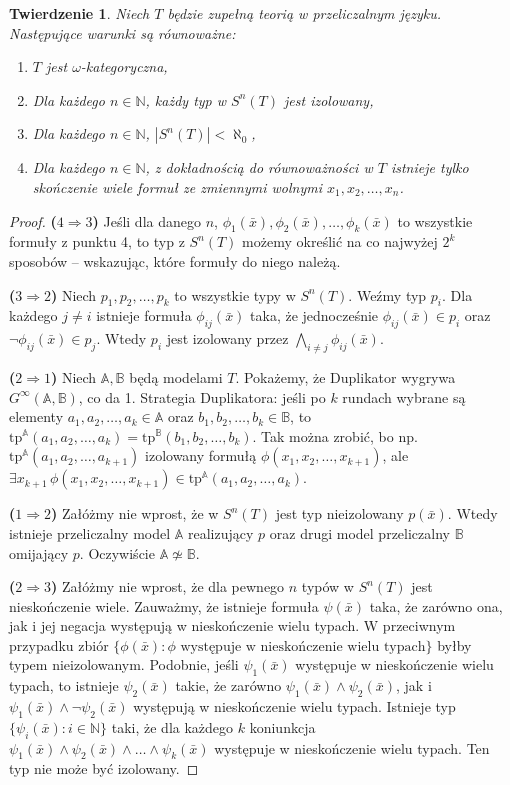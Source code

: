 \documentclass{article}
\newcommand{\N}{\mathbb{N}}
\newcommand{\A}{\mathbb{A}}
\newcommand{\B}{\mathbb{B}}
\theoremstyle{plain}
\newtheorem{tw}[thm]{Twierdzenie}
\theoremstyle{definition}
\theoremstyle{remark}
\begin{document}
\begin{tw}
	 Niech $T$ będzie zupełną teorią w przeliczalnym języku.
	 Następujące warunki są równoważne:
	 \begin{enumerate}
		 \item $T$ jest $\omega$-kategoryczna,
		 \item Dla każdego $n \in \N$, każdy typ w $S^n(T)$ jest izolowany,
		 \item Dla każdego $n \in \N$, $|S^n(T)| < \aleph_0$,
		 \item Dla każdego $n \in \N$, z dokładnością do równoważności w $T$ istnieje tylko skończenie wiele formuł ze zmiennymi wolnymi $x_1, x_2, \ldots, x_n$.
	 \end{enumerate}
\end{tw}
\begin{proof}
	\textbf{($4 \Rightarrow 3$)} Jeśli dla danego $n$, $\phi_1(\bar{x}), \phi_2(\bar{x}), \ldots, \phi_k(\bar{x})$  to wszystkie formuły z punktu 4, to typ z $S^n(T)$ możemy określić na co najwyżej $2^k$ sposobów -- wskazując, które formuły do niego należą.

	\textbf{($3 \Rightarrow 2$)} Niech $p_1, p_2, \ldots, p_k$ to wszystkie typy w $S^n(T)$.
	Weźmy typ $p_i$.
	Dla każdego $j \neq i$ istnieje formuła $\phi_{ij}(\bar{x})$ taka, że jednocześnie $\phi_{ij}(\bar{x}) \in p_i$ oraz $\neg \phi_{ij}(\bar{x}) \in p_j$.
	Wtedy $p_i$ jest izolowany przez $\bigwedge_{i \neq j} \phi_{ij}(\bar{x})$.

	\textbf{($2 \Rightarrow 1$)} Niech $\A, \B$ będą modelami $T$.
	Pokażemy, że Duplikator wygrywa $G^{\infty}(\A, \B)$, co da 1.
	Strategia Duplikatora:
	jeśli po $k$ rundach wybrane są elementy $a_1, a_2, \ldots, a_k \in \A$ oraz $b_1, b_2, \ldots, b_k \in \B$, to $\text{tp}^{\A}(a_1, a_2, \ldots, a_k) = \text{tp}^{\B}(b_1, b_2, \ldots, b_k)$.
	Tak można zrobić, bo np. $\text{tp}^{\A}(a_1, a_2, \ldots, a_{k+1})$ izolowany formułą
	$\phi(x_1, x_2, \ldots, x_{k+1})$, ale $\exists x_{k+1} \, \phi(x_1, x_2, \ldots, x_{k+1}) \in \text{tp}^{\A}(a_1, a_2, \ldots, a_k)$.

	\textbf{($1 \Rightarrow 2$)} Załóżmy nie wprost, że w $S^n(T)$ jest typ nieizolowany $p(\bar{x})$.
	Wtedy istnieje przeliczalny model $\A$ realizujący $p$ oraz drugi model przeliczalny $\B$ omijający $p$.
	Oczywiście $\A \not \simeq \B$.

	\textbf{($2 \Rightarrow 3$)}
	Załóżmy nie wprost, że dla pewnego $n$ typów w $S^n(T)$ jest nieskończenie wiele.
	Zauważmy, że istnieje formuła $\psi(\bar{x})$ taka, że zarówno ona, jak i jej negacja występują w nieskończenie wielu typach.
	W przeciwnym przypadku zbiór $\{\phi(\bar{x}) \colon \phi \text{ występuje w nieskończenie wielu typach}\}$ byłby typem nieizolowanym.
	Podobnie, jeśli $\psi_1(\bar{x})$ występuje w nieskończenie wielu typach, to istnieje $\psi_2(\bar{x})$ takie, że zarówno $\psi_1(\bar{x})\wedge \psi_2(\bar{x})$, jak i $\psi_1(\bar{x})\wedge \neg \psi_2(\bar{x})$ występują w nieskończenie wielu typach.
	Istnieje typ $\{\psi_i(\bar{x}) \colon i \in \N\}$ taki, że dla każdego $k $ koniunkcja $\psi_1(\bar{x}) \wedge \psi_2(\bar{x}) \wedge \ldots \wedge \psi_k(\bar{x})$ występuje w nieskończenie wielu typach.
	Ten typ nie może być izolowany.


\end{proof}
\end{document}
